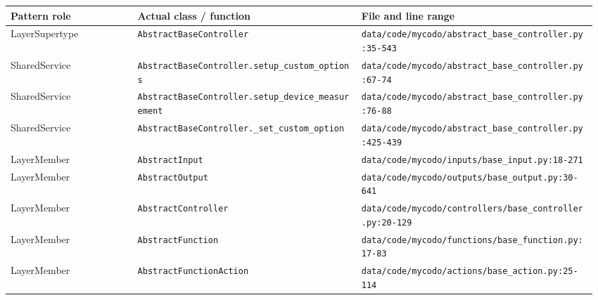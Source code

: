 \documentclass[11pt,a4paper]{article}
\begin{document}
{\small\setlength{\tabcolsep}{3pt}
\begin{longtable}{@{}P{0.21\linewidth}P{0.37\linewidth}P{0.39\linewidth}@{}}\toprule
\textbf{Pattern role} & \textbf{Actual class / function} & \textbf{File and line range} \\ \midrule\endhead
LayerSupertype & \texttt{AbstractBaseController} & \texttt{data/\allowbreak{}code/\allowbreak{}mycodo/\allowbreak{}abstract\_\allowbreak{}base\_\allowbreak{}controller.\allowbreak{}py:35-543} \\
SharedService & \texttt{AbstractBaseController.\allowbreak{}setup\_\allowbreak{}custom\_\allowbreak{}options} & \texttt{data/\allowbreak{}code/\allowbreak{}mycodo/\allowbreak{}abstract\_\allowbreak{}base\_\allowbreak{}controller.\allowbreak{}py:67-74} \\
SharedService & \texttt{AbstractBaseController.\allowbreak{}setup\_\allowbreak{}device\_\allowbreak{}measurement} & \texttt{data/\allowbreak{}code/\allowbreak{}mycodo/\allowbreak{}abstract\_\allowbreak{}base\_\allowbreak{}controller.\allowbreak{}py:76-88} \\
SharedService & \texttt{AbstractBaseController.\allowbreak{}\_\allowbreak{}set\_\allowbreak{}custom\_\allowbreak{}option} & \texttt{data/\allowbreak{}code/\allowbreak{}mycodo/\allowbreak{}abstract\_\allowbreak{}base\_\allowbreak{}controller.\allowbreak{}py:425-439} \\
LayerMember & \texttt{AbstractInput} & \texttt{data/\allowbreak{}code/\allowbreak{}mycodo/\allowbreak{}inputs/\allowbreak{}base\_\allowbreak{}input.\allowbreak{}py:18-271} \\
LayerMember & \texttt{AbstractOutput} & \texttt{data/\allowbreak{}code/\allowbreak{}mycodo/\allowbreak{}outputs/\allowbreak{}base\_\allowbreak{}output.\allowbreak{}py:30-641} \\
LayerMember & \texttt{AbstractController} & \texttt{data/\allowbreak{}code/\allowbreak{}mycodo/\allowbreak{}controllers/\allowbreak{}base\_\allowbreak{}controller.\allowbreak{}py:20-129} \\
LayerMember & \texttt{AbstractFunction} & \texttt{data/\allowbreak{}code/\allowbreak{}mycodo/\allowbreak{}functions/\allowbreak{}base\_\allowbreak{}function.\allowbreak{}py:17-83} \\
LayerMember & \texttt{AbstractFunctionAction} & \texttt{data/\allowbreak{}code/\allowbreak{}mycodo/\allowbreak{}actions/\allowbreak{}base\_\allowbreak{}action.\allowbreak{}py:25-114} \\
\bottomrule\end{longtable}}
\end{document}
